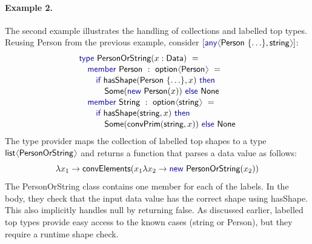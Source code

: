 \documentclass[10pt,preprint,blind,clearpagebib]{sigplanconf}
\newcommand{\langl}{\begin{picture}(4.5,7)
\put(1.1,2.5){\rotatebox{60}{\line(1,0){5.5}}}
\put(1.1,2.5){\rotatebox{300}{\line(1,0){5.5}}}
\end{picture}}
\newcommand{\rangl}{\begin{picture}(4.5,7)
\put(.9,2.5){\rotatebox{120}{\line(1,0){5.5}}}
\put(.9,2.5){\rotatebox{240}{\line(1,0){5.5}}}
\end{picture}}
\newcommand{\kvd}[1]{\textnormal{\textcolor{kvdclr}{\sffamily #1}}}
\newcommand{\ident}[1]{\textnormal{\sffamily #1}}
\begin{document}
\paragraph{Example 2.} The second example illustrates the handling of collections and 
labelled top types. Reusing \ident{Person} from the previous example, consider 
$[\kvd{any}\langl\ident{Person}~\{ \ldots \},\ident{string}\rangl]$:
%
\begin{equation*}
\begin{array}{l}
 \kvd{type}~\ident{PersonOrString}(x:\ident{Data})~= \\[0.1em]
 \quad \kvd{member}~\ident{Person}~:~\ident{option}\langl\ident{Person}\rangl~= \\[0.1em]
 \qquad \kvd{if}~\ident{hasShape}(\ident{Person}~\{ \ldots \}, x)~\kvd{then}\\[0.1em]
 \qquad\quad \ident{Some}(\kvd{new}~\ident{Person}(x))~\kvd{else}~\ident{None} \\[0.1em]
 \quad \kvd{member}~\ident{String}~:~\ident{option}\langl\ident{string}\rangl~= \\[0.1em]
 \qquad \kvd{if}~\ident{hasShape}(\ident{string}, x)~\kvd{then}\\[0.1em]
 \qquad\quad \ident{Some}(\ident{convPrim}(\ident{string}, x))~\kvd{else}~\ident{None}
\end{array}
\end{equation*}
%
The type provider maps the collection of labelled top shapes to a type $\ident{list}\langl\ident{PersonOrString}\rangl$
and returns a function that parses a data value as follows:
%
\begin{equation*}
\lambda x_1\rightarrow \ident{convElements}(x_1\lambda x_2\rightarrow\kvd{new}~\ident{PersonOrString}(x_2))
\end{equation*}
%
The \ident{PersonOrString} class contains one member for each of the labels. In the body, they
check that the input data value has the correct shape using \ident{hasShape}. This also implicitly 
handles \kvd{null} by returning \kvd{false}. As discussed earlier, labelled top types provide easy 
access to the known cases (\ident{string} or \ident{Person}), but they require a runtime shape check.

%
%
\end{document}
